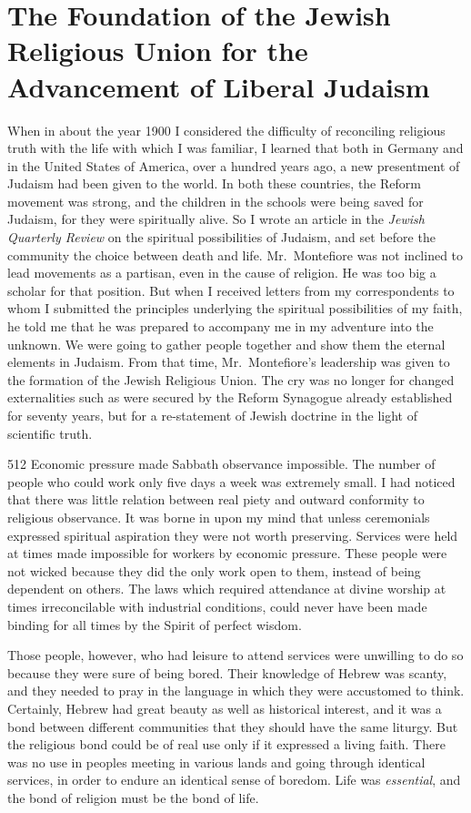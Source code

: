 \chapter{The Foundation of the Jewish Religious
Union for the Advancement of Liberal Judaism}

When in about the year 1900 I considered the difficulty
of reconciling religious truth with the life with which I
was familiar, I learned that both in Germany and in the
United States of America, over a hundred years ago, a
new presentment of Judaism had been given to the world.
In both these countries, the Reform movement was
strong, and the children in the schools were being saved
for Judaism, for they were spiritually alive. So I wrote
an article in the \textsl{Jewish Quarterly Review} on the spiritual
possibilities of Judaism, and set before the community
the choice between death and life. Mr.\ Montefiore was
not inclined to lead movements as a partisan, even in the
cause of religion. He was too big a scholar for that
position. But when I received letters from my correspondents
to whom I submitted the principles underlying
the spiritual possibilities of my faith, he told me
that he was prepared to accompany me in my adventure
into the unknown. We were going to gather people
together and show them the eternal elements in Judaism.
From that time, Mr.\ Montefiore’s leadership was given
to the formation of the Jewish Religious Union. The
cry was no longer for changed externalities such as were
secured by the Reform Synagogue already established
for seventy years, but for a re-statement of Jewish
doctrine in the light of scientific truth.

\begin{tp}{512}
Economic pressure made Sabbath observance impossible.
The number of people who could work only
five days a week was extremely small. I had noticed that
there was little relation between real piety and outward
conformity to religious observance. It was borne in upon
my mind that unless ceremonials expressed spiritual
aspiration they were not worth preserving. Services
were held at times made impossible for workers by
economic pressure. These people were not wicked
because they did the only work open to them, instead of
being dependent on others. The laws which required
attendance at divine worship at times irreconcilable
with industrial conditions, could never have been
made binding for all times by the Spirit of perfect
wisdom.
\end{tp}

Those people, however, who had leisure to attend
services were unwilling to do so because they were sure
of being bored. Their knowledge of Hebrew was scanty,
and they needed to pray in the language in which they
were accustomed to think. Certainly, Hebrew had great
beauty as well as historical interest, and it was a bond
between different communities that they should have the
same liturgy. But the religious bond could be of real
use only if it expressed a living faith. There was no use
in peoples meeting in various lands and going through
identical services, in order to endure an identical sense
of boredom. Life was \textsl{essential}, and the bond of religion
must be the bond of life.

